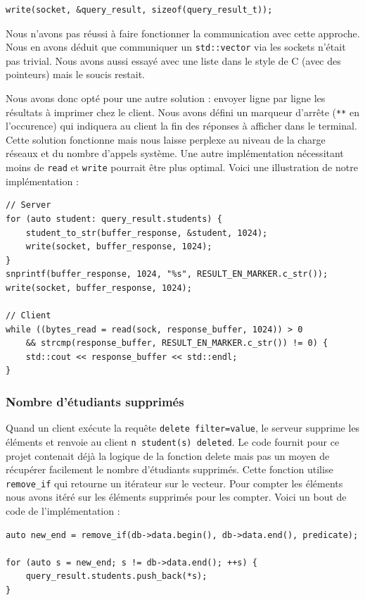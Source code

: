 \documentclass[utf8]{article}
\begin{document}
\begin{lstlisting}
write(socket, &query_result, sizeof(query_result_t));
\end{lstlisting}
	
	Nous n'avons pas réussi à faire fonctionner la communication avec cette approche. Nous en avons déduit que communiquer un \texttt{std::vector} via les sockets n'était pas trivial. Nous avons aussi essayé avec une liste dans le style de C (avec des pointeurs) mais le soucis restait.
	
	Nous avons donc opté pour une autre solution : envoyer ligne par ligne les résultats à imprimer chez le client. Nous avons défini un marqueur d'arrête (\texttt{**} en l'occurence) qui indiquera au client la fin des réponses à afficher dans le terminal. Cette solution fonctionne mais nous laisse perplexe au niveau de la charge réseaux et du nombre d'appels système. Une autre implémentation nécessitant moins de \texttt{read} et \texttt{write} pourrait être plus optimal. Voici une illustration de notre implémentation :

\begin{lstlisting}
// Server
for (auto student: query_result.students) {
	student_to_str(buffer_response, &student, 1024);
	write(socket, buffer_response, 1024);
}
snprintf(buffer_response, 1024, "%s", RESULT_EN_MARKER.c_str());
write(socket, buffer_response, 1024);

// Client 
while ((bytes_read = read(sock, response_buffer, 1024)) > 0
	&& strcmp(response_buffer, RESULT_EN_MARKER.c_str()) != 0) {
	std::cout << response_buffer << std::endl;
}
\end{lstlisting}

\subsubsection{Nombre d'étudiants supprimés}

Quand un client exécute la requête \texttt{delete filter=value}, le serveur supprime les éléments et renvoie au client \texttt{n student(s) deleted}. Le code fournit pour ce projet contenait déjà la logique de la fonction delete mais pas un moyen de récupérer facilement le nombre d'étudiants supprimés. Cette fonction utilise \texttt{remove\_if} qui retourne un itérateur sur le vecteur. Pour compter les éléments nous avons itéré sur les éléments supprimés pour les compter. Voici un bout de code de l'implémentation :

\begin{lstlisting}
auto new_end = remove_if(db->data.begin(), db->data.end(), predicate);

for (auto s = new_end; s != db->data.end(); ++s) {
	query_result.students.push_back(*s);
}
\end{lstlisting}
\end{document}
